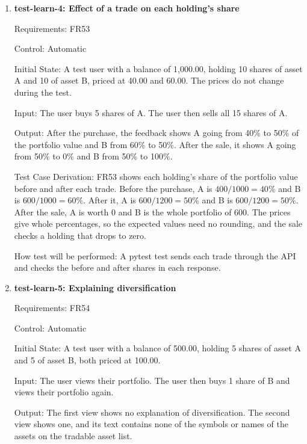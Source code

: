 \documentclass[12pt, titlepage]{article}
\begin{document}
\begin{enumerate}
How test will be performed: A pytest test sets each user's holdings, records
the view at the starting prices, sends the new prices to the backend, and
reads each user's portfolio and feedback through the API.

\item{\textbf{test-learn-4: Effect of a trade on each holding's share}\\}

Requirements: FR53

Control: Automatic

Initial State: A test user with a balance of 1,000.00, holding 10 shares of
asset A and 10 of asset B, priced at 40.00 and 60.00. The prices do not change
during the test.

Input: The user buys 5 shares of A. The user then sells all 15 shares of A.

Output: After the purchase, the feedback shows A going from 40\% to 50\% of
the portfolio value and B from 60\% to 50\%. After the sale, it shows A going
from 50\% to 0\% and B from 50\% to 100\%.

Test Case Derivation: FR53 shows each holding's share of the portfolio value
before and after each trade. Before the purchase, A is $400 / 1000 = 40\%$ and
B is $600 / 1000 = 60\%$. After it, A is $600 / 1200 = 50\%$ and B is
$600 / 1200 = 50\%$. After the sale, A is worth 0 and B is the whole
portfolio of 600. The prices give whole percentages, so the expected values
need no rounding, and the sale checks a holding that drops to zero.

How test will be performed: A pytest test sends each trade through the API
and checks the before and after shares in each response.

\item{\textbf{test-learn-5: Explaining diversification}\\}

Requirements: FR54

Control: Automatic

Initial State: A test user with a balance of 500.00, holding 5 shares of
asset A and 5 of asset B, both priced at 100.00.

Input: The user views their portfolio. The user then buys 1 share of B and
views their portfolio again.

Output: The first view shows no explanation of diversification. The second
view shows one, and its text contains none of the symbols or names of the
assets on the tradable asset list.


\end{enumerate}
\end{document}
